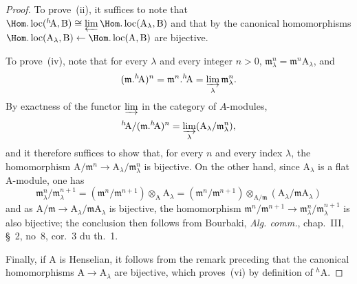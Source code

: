 \begin{proof}
To prove~(ii), it suffices to note that $\Hom.\operatorname{loc}({}^h\!\mathrm{A},\mathrm{B})\cong\varprojlim\Hom.\operatorname{loc}(\mathrm{A}_\lambda,\mathrm{B})$ and that by  the canonical homomorphisms $\Hom.\operatorname{loc}(\mathrm{A}_\lambda,\mathrm{B})\leftarrow\Hom.\operatorname{loc}(\mathrm{A},\mathrm{B})$ are bijective.

To prove~(iv), note that for every $\lambda$ and every integer $n>0$, $\mathfrak{m}_\lambda^n=\mathfrak{m}^n\mathrm{A}_\lambda$, and
\[
(\mathfrak{m}.{}^h\!\mathrm{A})^n=\mathfrak{m}^n.{}^h\!\mathrm{A}=\varinjlim_\lambda\mathfrak{m}_\lambda^n.
\]
By exactness of the functor $\varinjlim$ in the category of $A$-modules,
\[
{}^h\!\mathrm{A}/(\mathfrak{m}.{}^h\!\mathrm{A})^n=\varinjlim_\lambda(\mathrm{A}_\lambda/\mathfrak{m}_\lambda^n),
\]
and it therefore suffices to show that, for every $n$ and every index $\lambda$, the homomorphism $\mathrm{A}/\mathfrak{m}^n\to\mathrm{A}_\lambda/\mathfrak{m}_\lambda^n$ is bijective.
On the other hand, since $\mathrm{A}_\lambda$ is a flat A-module, one has
\[
  \mathfrak{m}_\lambda^n/\mathfrak{m}_\lambda^{n+1}=(\mathfrak{m}^n/\mathfrak{m}^{n+1})\otimes_{\mathrm{A}}\mathrm{A}_\lambda
  =(\mathfrak{m}^n/\mathfrak{m}^{n+1})\otimes_{\mathrm{A}/\mathfrak{m}}(\mathrm{A}_\lambda/\mathfrak{m}\mathrm{A}_\lambda)
\]
and as $\mathrm{A}/\mathfrak{m}\to\mathrm{A}_\lambda/\mathfrak{m}\mathrm{A}_\lambda$ is bijective, the homomorphism $\mathfrak{m}^n/\mathfrak{m}^{n+1}\to\mathfrak{m}_\lambda^n/\mathfrak{m}_\lambda^{n+1}$ is also bijective;
the conclusion then follows from Bourbaki, \emph{Alg. comm.}, chap.~III, \S~2, no~8, cor.~3 du th.~1.

Finally, if A is Henselian, it follows from the remark preceding  that the canonical homomorphisms $\mathrm{A}\to\mathrm{A}_\lambda$ are bijective, which proves~(vi) by definition of ${}^h\!\mathrm{A}$.
\end{proof}

